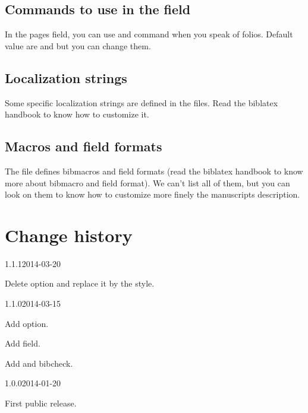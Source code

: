 \documentclass{ltxdockit}[2011/03/25]
\newcommand{\biblatex}{biblatex\xspace}
\begin{document}
\subsection{Commands to use in the  field}

In the pages field, you can use  and  command when you speak of folios. Default value are  and  but you can change them.

\subsection{Localization strings}

Some specific localization strings are defined in the  files. Read the \biblatex handbook to know how to customize it.

\subsection{Macros and field formats}

The  file defines bibmacros and field formats (read the \biblatex handbook to know more about bibmacro and field format). We can't list all of them, but you can look on them to know how to customize more finely the manuscripts description.

\section{Change history}

\begin{changelog}

\begin{release}{1.1.1}{2014-03-20}
	\item Delete  option and replace it by the  style. 
\end{release}

\begin{release}{1.1.0}{2014-03-15}
\item Add  option.
\item Add  field.
\item Add  and  bibcheck. 
\end{release}

\begin{release}{1.0.0}{2014-01-20}
\item First public release.
\end{release}
\end{changelog}
\end{document}
